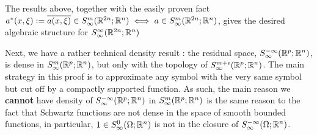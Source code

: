 \documentclass[12pt]{article}
\begin{document}
The results above, together with the easily proven fact $ a^*(x, \xi) := \overline{a(x, \xi)} \in S^{m}_\infty({\mathbb R}^{2n}; {\mathbb R}^n) \iff a \in S^{m}_\infty({\mathbb R}^{2n}; {\mathbb R}^n)$, gives the desired algebraic structure for $S^{\infty}_\infty({\mathbb R}^{2n}; {\mathbb R}^n)$

Next, we have a rather technical density result : the residual space, $S^{-\infty}_\infty({\mathbb R}^{p}; {\mathbb R}^n)$, is dense in $S^{m}_\infty({\mathbb R}^p; {\mathbb R}^n)$, but only with the topology of $S^{m + \epsilon}_\infty({\mathbb R}^{p}; {\mathbb R}^n)$. The main strategy in this proof is to approximate any symbol with the very same symbol but cut off by a compactly supported function. As such, the main reason we \textbf{cannot} have density of $S^{-\infty}_\infty({\mathbb R}^p; {\mathbb R}^n)$ in $S^m_\infty({\mathbb R}^p; {\mathbb R}^n)$ is the same reason to the fact that Schwartz functions are not dense in the space of smooth bounded functions, in particular, $1 \in S^0_\infty(\Omega; {\mathbb R}^n)$ is not in the closure of $S^{-\infty}_\infty(\Omega; {\mathbb R}^n)$. \\
\end{document}
